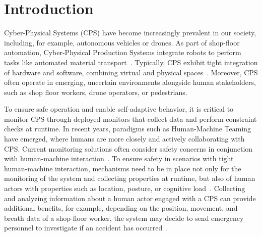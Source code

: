 \section{Introduction}
\label{sec:intro}


Cyber-Physical Systems (CPS) have become increasingly prevalent in our society, including, for example, autonomous vehicles or drones.
As part of shop-floor automation, Cyber-Physical Production Systems integrate robots to perform tasks like automated material transport~\cite{theunissen2018smart}.
Typically, CPS exhibit tight integration of hardware and software, combining virtual and physical spaces~\cite{broy2013engineering}. Moreover, CPS often operate in emerging, uncertain environments alongside human stakeholders, such as shop floor workers, drone operators, or pedestrians.

To ensure safe operation and enable self-adaptive behavior, it is critical to monitor CPS through deployed monitors that collect data and perform constraint checks at runtime.
In recent years, paradigms such as Human-Machine Teaming have emerged, where humans are more closely and actively collaborating with CPS.
Current monitoring solutions often consider safety concerns in conjunction with human-machine interaction~\cite{tan2011triple}.
To ensure safety in scenarios with tight human-machine interaction, mechanisms need to be in place not only for the monitoring of the system and collecting properties at runtime, but also of human actors with properties such as location, posture, or cognitive load~\cite{mukhopadhyay2014wearable}. Collecting and analyzing information about a human actor engaged with a CPS can provide additional benefits, for example, depending on the position, movement, and breath data of a shop-floor worker, the system may decide to send emergency personnel to investigate if an accident has occurred~\cite{nwakanma2021Detection}.

